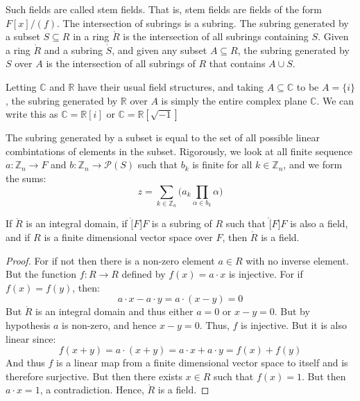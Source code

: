     Such fields are called stem fields. That is, stem fields are fields of
    the form $F[x]/(f)$. The intersection of subrings is a subring. The
    subring generated by a subset $S\subseteq{R}$ in a ring $\ring{R}$ is
    the intersection of all subrings containing $S$. Given a ring
    $\ring{R}$ and a subring $\ring{S}$, and given any subset
    $A\subseteq{R}$, the subring generated by $S$ over $A$ is the
    intersection of all subrings of $R$ that contains $A\cup{S}$.
    \begin{example}
        Letting $\mathbb{C}$ and $\mathbb{R}$ have their usual field
        structures, and taking $A\subseteq\mathbb{C}$ to be $A=\{i\}$, the
        subring generated by $\mathbb{R}$ over $A$ is simply the entire
        complex plane $\mathbb{C}$. We can write this as
        $\mathbb{C}=\mathbb{R}[i]$ or
        $\mathbb{C}=\mathbb{R}[\sqrt{\minus{1}}]$
    \end{example}
    The subring generated by a subset is equal to the set of all possible
    linear combintations of elements in the subset. Rigorously, we look at
    all finite sequence $a:\mathbb{Z}_{n}\rightarrow{F}$ and
    $b:\mathbb{Z}_{n}\rightarrow\mathcal{P}(S)$ such that $b_{k}$ is finite
    for all $k\in\mathbb{Z}_{n}$, and we form the sums:
    \begin{equation}
        z=\sum_{k\in\mathbb{Z}_{n}}\Big(
            a_{k}\prod_{\alpha\in{b}_{k}}\alpha
        \Big)
    \end{equation}
    \begin{theorem}
        If $\ring{R}$ is an integral domain, if $\ring[F]{F}$ is a subring
        of $R$ such that $\ring[F]{F}$ is also a field, and if $R$ is a
        finite dimensional vector space over $F$, then $\ring{R}$ is a
        field.
    \end{theorem}
    \begin{proof}
        For if not then there is a non-zero element $a\in{R}$ with no
        inverse element. But the function $f:R\rightarrow{R}$ defined by
        $f(x)=a\cdot{x}$ is injective. For if $f(x)=f(y)$, then:
        \begin{equation}
            a\cdot{x}-a\cdot{y}=a\cdot(x-y)=0
        \end{equation}
        But $\ring{R}$ is an integral domain and thus either $a=0$ or
        $x-y=0$. But by hypothesis $a$ is non-zero, and hence $x-y=0$.
        Thus, $f$ is injective. But it is also linear since:
        \begin{equation}
            f(x+y)=a\cdot(x+y)=a\cdot{x}+a\cdot{y}=f(x)+f(y)
        \end{equation}
        And thus $f$ is a linear map from a finite dimensional vector space
        to itself and is therefore surjective. But then there exists
        $x\in{R}$ such that $f(x)=1$. But then $a\cdot{x}=1$, a
        contradiction. Hence, $\ring{R}$ is a field.
    \end{proof}
